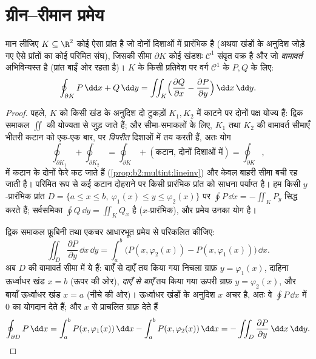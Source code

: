 \section{ग्रीन--रीमान प्रमेय}

\begin{theorem}[ग्रीन--रीमान]\label{thm:b2:multint:green}
मान लीजिए $K \subseteq \R^2$ कोई ऐसा  प्रांत है जो दोनों दिशाओं में
प्रारंभिक है (अथवा खंडों के अनुदिश जोड़े गए ऐसे प्रांतों का कोई
परिमित संघ), जिसकी सीमा $\partial K$ कोई खंडशः $\mathcal{C}^1$ संवृत वक्र है और जो
\emph{वामावर्त} अभिविन्यस्त है (प्रांत बाईं ओर रहता है)। $K$ के
किसी प्रतिवेश पर वर्ग $\mathcal{C}^1$ के $P, Q$ के लिए:
\[
\oint_{\partial K} P\,\dd x + Q\,\dd y
= \iint_K \Bigl(\frac{\partial Q}{\partial x}
- \frac{\partial P}{\partial y}\Bigr)\,\dd x\,\dd y .
\]
\end{theorem}

\begin{proof}
पहले, $K$ को किसी खंड के अनुदिश दो टुकड़ों $K_1, K_2$ में काटने पर दोनों
पक्ष योज्य हैं: द्विक समाकल $\iint$ की योज्यता से जुड़ जाते हैं; और
सीमा-समाकलों के लिए, $K_1$ तथा $K_2$ की वामावर्त सीमाएँ भीतरी कटान को
एक-एक बार, पर \emph{विपरीत} दिशाओं में तय करती हैं, अतः योग
\[
\oint_{\partial K_1} + \oint_{\partial K_2}
= \oint_{\partial K} + (\text{कटान, दोनों दिशाओं में})
= \oint_{\partial K},
\]
में कटान के दोनों फेरे कट जाते हैं (\cref{prop:b2:multint:lineinv}) और केवल बाहरी सीमा बची
रह जाती है। परिमित रूप से कई कटान दोहराने पर किसी प्रारंभिक प्रांत
को साधना पर्याप्त है। हम किसी $y$-प्रारंभिक प्रांत $D = \{a \leq x \leq b,\ \varphi_1(x) \leq y
\leq \varphi_2(x)\}$ पर $\oint P\,\dd x = -\iint_K P_y$
सिद्ध करते हैं; सर्वसमिका $\oint Q\,\dd y = \iint_K Q_x$  है ($x$-प्रारंभिक), और
प्रमेय उनका योग है।

द्विक समाकल फ़ूबिनी तथा एकचर आधारभूत प्रमेय से परिकलित कीजिए:
\[
\iint_D \frac{\partial P}{\partial y}\,\dd x\,\dd y
= \int_a^b \bigl(P(x, \varphi_2(x)) - P(x, \varphi_1(x))\bigr)
\,\dd x .
\]
अब $D$ की वामावर्त सीमा में ये हैं: बाएँ से दाएँ तय किया गया निचला
ग्राफ़ $y = \varphi_1(x)$, दाहिना ऊर्ध्वाधर खंड $x = b$ (ऊपर की ओर), \emph{दाएँ से
बाएँ} तय किया गया ऊपरी ग्राफ़ $y =
\varphi_2(x)$, और बायाँ ऊर्ध्वाधर खंड $x = a$
(नीचे की ओर)। ऊर्ध्वाधर खंडों के अनुदिश $x$ अचर है, अतः वे $\oint P\,\dd x$ में
$0$ का योगदान देते हैं; और $x$ से प्राचलित ग्राफ़ देते हैं
\[
\oint_{\partial D} P\,\dd x
= \int_a^b P(x, \varphi_1(x))\,\dd x
- \int_a^b P(x, \varphi_2(x))\,\dd x
= -\iint_D \frac{\partial P}{\partial y}\,\dd x\,\dd y .
\qedhere
\]
\end{proof}

